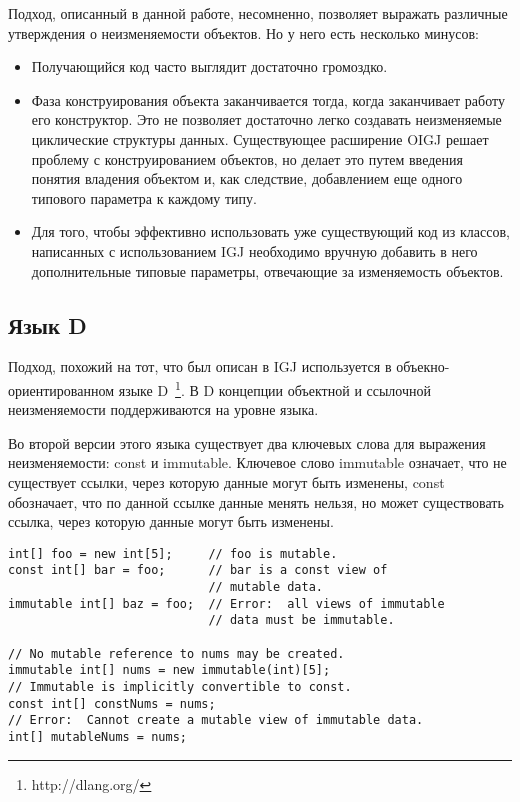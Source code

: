 Подход, описанный в данной работе, несомненно, позволяет выражать различные утверждения о неизменяемости объектов. Но у него есть несколько минусов:
\begin{itemize}
\item Получающийся код часто выглядит достаточно громоздко.
\item Фаза конструирования объекта заканчивается тогда, когда заканчивает работу его конструктор. Это не позволяет достаточно легко создавать неизменяемые циклические структуры данных. Существующее расширение OIGJ \cite{Potanin} решает проблему с конструированием объектов, но делает это путем введения понятия владения объектом и, как следствие, добавлением еще одного типового параметра к каждому типу. 
\item Для того, чтобы эффективно использовать уже существующий код из классов, написанных с использованием IGJ необходимо вручную добавить в него дополнительные типовые параметры, отвечающие за изменяемость объектов.
\end{itemize}

\subsection{Язык D}

Подход, похожий на тот, что был описан в IGJ используется в объекно-ориентированном языке D~\footnote{http://dlang.org/}. В D концепции объектной и ссылочной неизменяемости поддерживаются на уровне языка.

Во второй версии этого языка существует два ключевых слова для выражения неизменяемости: const и immutable. Ключевое слово immutable означает, что не существует ссылки, через которую данные могут быть изменены, const обозначает, что по данной ссылке данные менять нельзя, но может существовать ссылка, через которую данные могут быть изменены. 

\begin{lstlisting}[caption=const vs immutable, label=code:d_const_vs_immutable]
int[] foo = new int[5];     // foo is mutable.
const int[] bar = foo;      // bar is a const view of 
                            // mutable data.
immutable int[] baz = foo;  // Error:  all views of immutable 
                            // data must be immutable.
 
// No mutable reference to nums may be created.
immutable int[] nums = new immutable(int)[5]; 
// Immutable is implicitly convertible to const.
const int[] constNums = nums;         
// Error:  Cannot create a mutable view of immutable data.         
int[] mutableNums = nums;                      
\end{lstlisting}

